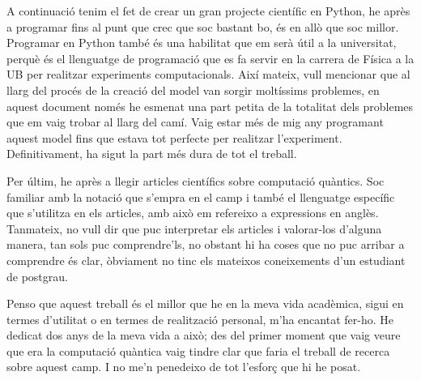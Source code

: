 A continuació tenim el fet de crear un gran projecte científic en Python, he après a programar fins al punt que crec que soc bastant bo, és en allò que soc millor. Programar en Python també és una habilitat que em serà útil a la universitat, perquè és el llenguatge de programació que es fa servir en la carrera de Física a la UB per realitzar experiments computacionals. Així mateix, vull mencionar que al llarg del procés de la creació del model van sorgir moltíssims problemes, en aquest document només he esmenat una part petita de la totalitat dels problemes que em vaig trobar al llarg del camí. Vaig estar més de mig any programant aquest model fins que estava tot perfecte per realitzar l'experiment. Definitivament, ha sigut la part més dura de tot el treball.

Per últim, he après a llegir articles científics sobre computació quàntics. Soc familiar amb la notació que s'empra en el camp i també el llenguatge específic que s'utilitza en els articles, amb això em refereixo a expressions en anglès. Tanmateix, no vull dir que puc interpretar els articles i valorar-los d'alguna manera, tan sols puc comprendre'ls, no obstant hi ha coses que no puc arribar a comprendre és clar, òbviament no tinc els mateixos coneixements d'un estudiant de postgrau.

Penso que aquest treball és el millor que he en la meva vida acadèmica, sigui en termes d'utilitat o en termes de realització personal, m'ha encantat fer-ho. He dedicat dos anys de la meva vida a això; des del primer moment que vaig veure que era la computació quàntica vaig tindre clar que faria el treball de recerca sobre aquest camp. I no me'n penedeixo de tot l'esforç que hi he posat.
